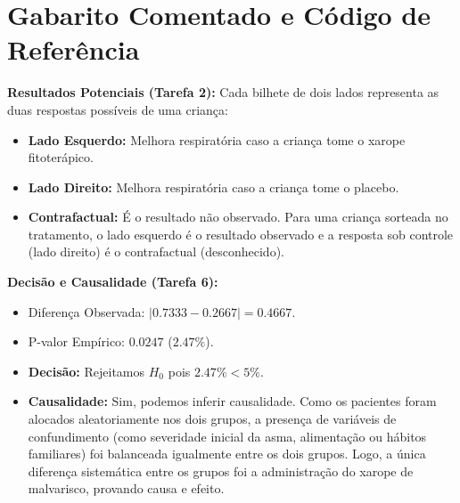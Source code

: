 \documentclass[12pt]{article}
\begin{document}
\pagebreak

\section*{Gabarito Comentado e Código de Referência}

\begin{tcolorbox}[colback=yellow!10!white,colframe=yellow!50!black,title=\textbf{Gabarito das Tarefas Teóricas}]
\textbf{Resultados Potenciais (Tarefa 2):}
Cada bilhete de dois lados representa as duas respostas possíveis de uma criança:
\begin{itemize}
    \item \textbf{Lado Esquerdo:} Melhora respiratória caso a criança tome o xarope fitoterápico.
    \item \textbf{Lado Direito:} Melhora respiratória caso a criança tome o placebo.
    \item \textbf{Contrafactual:} É o resultado não observado. Para uma criança sorteada no tratamento, o lado esquerdo é o resultado observado e a resposta sob controle (lado direito) é o contrafactual (desconhecido).
\end{itemize}

\textbf{Decisão e Causalidade (Tarefa 6):}
\begin{itemize}
    \item Diferença Observada: $|0.7333 - 0.2667| = 0.4667$.
    \item P-valor Empírico: $0.0247$ ($2.47\%$).
    \item \textbf{Decisão:} Rejeitamos $H_0$ pois $2.47\% < 5\%$.
    \item \textbf{Causalidade:} Sim, podemos inferir causalidade. Como os pacientes foram alocados aleatoriamente nos dois grupos, a presença de variáveis de confundimento (como severidade inicial da asma, alimentação ou hábitos familiares) foi balanceada igualmente entre os dois grupos. Logo, a única diferença sistemática entre os grupos foi a administração do xarope de malvarisco, provando causa e efeito.
\end{itemize}
\end{tcolorbox}
\end{document}
